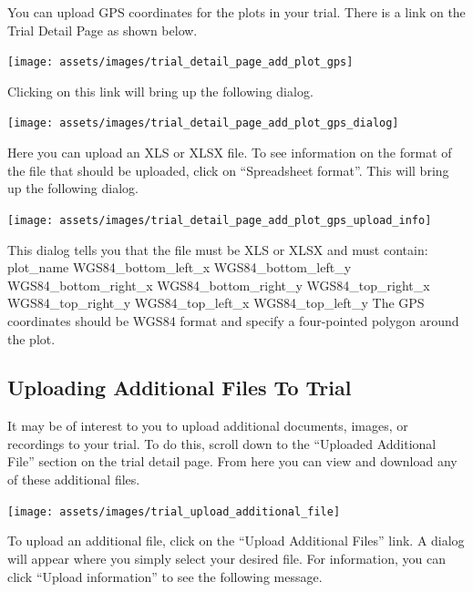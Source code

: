\documentclass[
  12pt,
]{book}
\begin{document}
You can upload GPS coordinates for the plots in your trial. There is a link on the Trial Detail Page as shown below.

\begin{center}\texttt{[image: assets/images/trial\_detail\_page\_add\_plot\_gps]} \end{center}

Clicking on this link will bring up the following dialog.

\begin{center}\texttt{[image: assets/images/trial\_detail\_page\_add\_plot\_gps\_dialog]} \end{center}

Here you can upload an XLS or XLSX file. To see information on the format of the file that should be uploaded, click on ``Spreadsheet format''. This will bring up the following dialog.

\begin{center}\texttt{[image: assets/images/trial\_detail\_page\_add\_plot\_gps\_upload\_info]} \end{center}

This dialog tells you that the file must be XLS or XLSX and must contain: plot\_name WGS84\_bottom\_left\_x WGS84\_bottom\_left\_y WGS84\_bottom\_right\_x WGS84\_bottom\_right\_y WGS84\_top\_right\_x WGS84\_top\_right\_y WGS84\_top\_left\_x WGS84\_top\_left\_y The GPS coordinates should be WGS84 format and specify a four-pointed polygon around the plot.

\hypertarget{uploading-additional-files-to-trial}{%
\subsection{Uploading Additional Files To Trial}\label{uploading-additional-files-to-trial}}

It may be of interest to you to upload additional documents, images, or recordings to your trial. To do this, scroll down to the ``Uploaded Additional File'' section on the trial detail page. From here you can view and download any of these additional files.

\begin{center}\texttt{[image: assets/images/trial\_upload\_additional\_file]} \end{center}

To upload an additional file, click on the ``Upload Additional Files'' link. A dialog will appear where you simply select your desired file. For information, you can click ``Upload information'' to see the following message.
\end{document}
